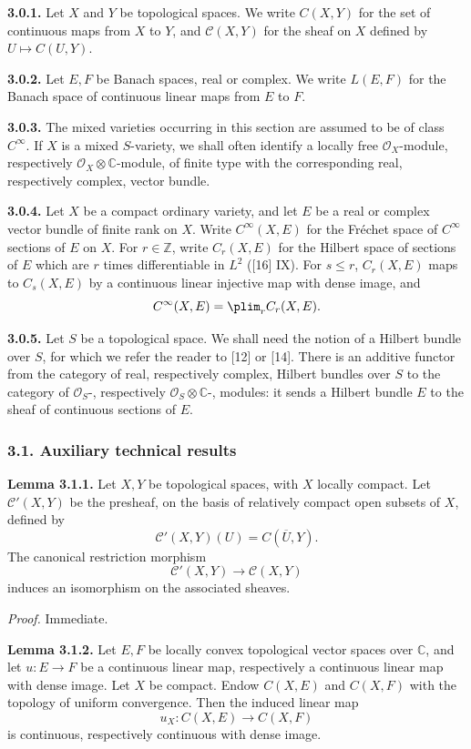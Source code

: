 \documentclass[11pt]{article}
\begin{document}
\textbf{3.0.1.} Let $X$ and $Y$ be topological spaces. We write $C(X,Y)$ for the set of continuous maps from $X$ to $Y$, and $\mathcal C(X,Y)$ for the sheaf on $X$ defined by $U\mapsto C(U,Y)$.

\textbf{3.0.2.} Let $E,F$ be Banach spaces, real or complex. We write $L(E,F)$ for the Banach space of continuous linear maps from $E$ to $F$.

\textbf{3.0.3.} The mixed varieties occurring in this section are assumed to be of class $C^\infty$. If $X$ is a mixed $S$-variety, we shall often identify a locally free $\mathcal O_X$-module, respectively $\mathcal O_X\otimes\mathbb C$-module, of finite type with the corresponding real, respectively complex, vector bundle.

\textbf{3.0.4.} Let $X$ be a compact ordinary variety, and let $E$ be a real or complex vector bundle of finite rank on $X$. Write $C^\infty(X,E)$ for the Fréchet space of $C^\infty$ sections of $E$ on $X$. For $r\in\mathbb Z$, write $C_r(X,E)$ for the Hilbert space of sections of $E$ which are $r$ times differentiable in $L^2$ ([16] IX). For $s\le r$, $C_r(X,E)$ maps to $C_s(X,E)$ by a continuous linear injective map with dense image, and
\[
 C^\infty(X,E)=\plim_r C_r(X,E).
\]

\textbf{3.0.5.} Let $S$ be a topological space. We shall need the notion of a Hilbert bundle over $S$, for which we refer the reader to [12] or [14]. There is an additive functor from the category of real, respectively complex, Hilbert bundles over $S$ to the category of $\mathcal O_S$-, respectively $\mathcal O_S\otimes\mathbb C$-, modules: it sends a Hilbert bundle $E$ to the sheaf of continuous sections of $E$.

\subsubsection*{3.1. Auxiliary technical results}

\textbf{Lemma 3.1.1.} Let $X,Y$ be topological spaces, with $X$ locally compact. Let $\mathcal C'(X,Y)$ be the presheaf, on the basis of relatively compact open subsets of $X$, defined by
\[
 \mathcal C'(X,Y)(U)=C(\overline U,Y).
\]
The canonical restriction morphism
\[
 \mathcal C'(X,Y)\longrightarrow \mathcal C(X,Y)
\]
induces an isomorphism on the associated sheaves.

\emph{Proof.} Immediate.

\textbf{Lemma 3.1.2.} Let $E,F$ be locally convex topological vector spaces over $\mathbb C$, and let $u:E\to F$ be a continuous linear map, respectively a continuous linear map with dense image. Let $X$ be compact. Endow $C(X,E)$ and $C(X,F)$ with the topology of uniform convergence. Then the induced linear map
\[
 u_X:C(X,E)\longrightarrow C(X,F)
\]
is continuous, respectively continuous with dense image.
\end{document}
